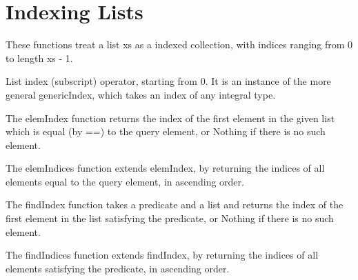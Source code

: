 \section{Indexing Lists}
These functions treat a list xs as a indexed collection, with indices ranging from 0 to length xs - 1.

List index (subscript) operator, starting from 0. It is an instance of the more general genericIndex, which takes an index of any integral type.

The elemIndex function returns the index of the first element in the given list which is equal (by ==) to the query element, or Nothing if there is no such element.

The elemIndices function extends elemIndex, by returning the indices of all elements equal to the query element, in ascending order.

The findIndex function takes a predicate and a list and returns the index of the first element in the list satisfying the predicate, or Nothing if there is no such element.

The findIndices function extends findIndex, by returning the indices of all elements satisfying the predicate, in ascending order.